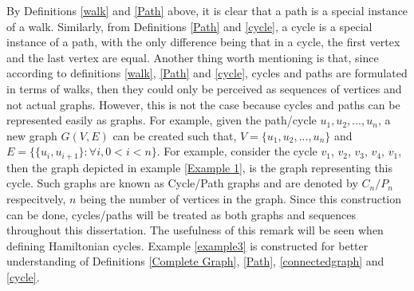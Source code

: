 \documentclass[12pt]{article}
\numberwithin{equation}{subsection}
\numberwithin{table}{subsection}
\numberwithin{algorithm}{subsection}
\begin{document}
By Definitions \ref{walk} and \ref{Path} above, it is clear that a path is a special instance of a walk. Similarly, from Definitions \ref{Path} and \ref{cycle}, a cycle is a special instance of a path, with the only difference being that in a cycle, the first vertex and the last vertex are equal. Another thing worth mentioning is that, since according to definitions \ref{walk}, \ref{Path} and \ref{cycle}, cycles and paths are formulated in terms of walks, then they could only be perceived as sequences of vertices and not actual graphs. However, this is not the case because cycles and paths can be represented easily as graphs. For example, given the path/cycle $\mathit{u_1, u_2, ...,u_n}$, a new graph $\mathit{G(V,E)}$ can be created such that, $\mathit{V= \{ u_1, u_2, ..., u_n\}}$ and $\mathit{E = \{ \{u_i, u_{i+1}\} : \forall i, 0 < i < n\}}$. For example, consider the cycle $v_1$, $v_2$, $v_3$, $v_4$, $v_1$, then the graph depicted in example \ref{Example 1}, is the graph representing this cycle. Such graphs are known as Cycle/Path graphs and are denoted by $\mathit{C_n/P_n}$ respecitvely, $\mathit{n}$ being the number of vertices in the graph. Since this construction can be done, cycles/paths will be treated as both graphs and sequences throughout this dissertation. The usefulness of this remark will be seen when defining Hamiltonian cycles. Example \ref{example3} is constructed for better understanding of Definitions \ref{Complete Graph}, \ref{Path}, \ref{connectedgraph} and \ref{cycle}.
\end{document}
